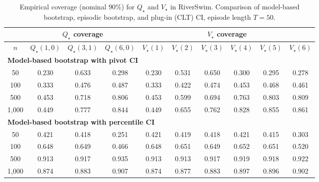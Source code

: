 \documentclass{article}
\numberwithin{equation}{section}
\begin{document}
\begin{table}[ht]
\centering
\caption{Empirical coverage (nominal $90\%$) for $Q_\star$ and $V_\star$ in RiverSwim. Comparison of model-based bootstrap, episodic bootstrap, and plug-in (CLT) CI, episode length $T=50$.}
\label{tab:riverswim-optimal-coverage-T50-90}
\begin{tabular}{c|ccc|cccccc}
\hline
& \multicolumn{3}{c|}{$Q_\star$ coverage} & \multicolumn{6}{c}{$V_\star$ coverage} \\ \hline
$n$
& $Q_\star(1,0)$ & $Q_\star(3,1)$ & $Q_\star(6,0)$
& $V_\star(1)$ & $V_\star(2)$ & $V_\star(3)$ & $V_\star(4)$ & $V_\star(5)$ & $V_\star(6)$ \\
\hline
\multicolumn{10}{l}{\textbf{Model-based bootstrap with pivot CI}} \\ \hline
50
& 0.230 & 0.633 & 0.298
& 0.230 & 0.531 & 0.650 & 0.300 & 0.295 & 0.278 \\
100
& 0.333 & 0.476 & 0.487
& 0.333 & 0.422 & 0.474 & 0.453 & 0.468 & 0.461 \\
500
& 0.453 & \cellcolor{covheat!9!white}0.718 & \cellcolor{covheat!53!white}0.806
& 0.453 & 0.599 & 0.694 & \cellcolor{covheat!32!white}0.763 & \cellcolor{covheat!52!white}0.803 & \cellcolor{covheat!55!white}0.809 \\
1{,}000
& 0.449 & \cellcolor{covheat!39!white}0.777 & \cellcolor{covheat!72!white}0.844
& 0.449 & 0.655 & \cellcolor{covheat!31!white}0.762 & \cellcolor{covheat!64!white}0.828 & \cellcolor{covheat!77!white}0.855 & \cellcolor{covheat!80!white}0.861 \\
\hline
\multicolumn{10}{l}{\textbf{Model-based bootstrap with percentile CI}} \\ \hline
50
& 0.421 & 0.418 & 0.251
& 0.421 & 0.419 & 0.418 & 0.421 & 0.415 & 0.303 \\
100
& 0.648 & 0.649 & 0.466
& 0.648 & 0.651 & 0.649 & 0.652 & 0.651 & 0.520 \\
500
& \cellcolor{covheat!100!white}0.913 & \cellcolor{covheat!100!white}0.917 & \cellcolor{covheat!100!white}0.935
& \cellcolor{covheat!100!white}0.913 & \cellcolor{covheat!100!white}0.913 & \cellcolor{covheat!100!white}0.917 & \cellcolor{covheat!100!white}0.919 & \cellcolor{covheat!100!white}0.918 & \cellcolor{covheat!100!white}0.922 \\
1{,}000
& \cellcolor{covheat!87!white}0.874 & \cellcolor{covheat!91!white}0.883 & \cellcolor{covheat!100!white}0.907
& \cellcolor{covheat!87!white}0.874 & \cellcolor{covheat!88!white}0.877 & \cellcolor{covheat!91!white}0.883 & \cellcolor{covheat!98!white}0.897 & \cellcolor{covheat!98!white}0.896 & \cellcolor{covheat!100!white}0.902 \\

\end{tabular}
\end{table}
\end{document}
